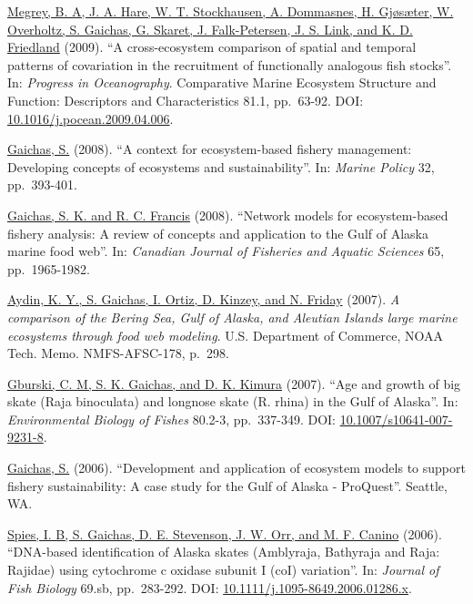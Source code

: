 \documentclass[11pt, a4paper]{awesome-cv}
\begin{document}
\protect\hyperlink{cite-megrey_cross-ecosystem_2009}{Megrey, B. A, J. A. Hare,
W. T. Stockhausen, A. Dommasnes, H. Gjøsæter, W. Overholtz, S. Gaichas,
G. Skaret, J. Falk-Petersen, J. S. Link, and K. D.
Friedland} (2009). ``A
cross-ecosystem comparison of spatial and temporal patterns of
covariation in the recruitment of functionally analogous fish stocks''.
In: \emph{Progress in Oceanography}. Comparative Marine Ecosystem Structure
and Function: Descriptors and Characteristics 81.1, pp.~63-92. DOI:
\href{https://doi.org/10.1016\%2Fj.pocean.2009.04.006}{10.1016/j.pocean.2009.04.006}.

\protect\hyperlink{cite-gaichas_context_2008}{Gaichas,
S.} (2008). ``A context for ecosystem-based
fishery management: Developing concepts of ecosystems and
sustainability''. In: \emph{Marine Policy} 32, pp.~393-401.

\protect\hyperlink{cite-gaichas_network_2008}{Gaichas, S. K. and R. C.
Francis} (2008). ``Network models for
ecosystem-based fishery analysis: A review of concepts and application
to the Gulf of Alaska marine food web''. In: \emph{Canadian Journal of
Fisheries and Aquatic Sciences} 65, pp.~1965-1982.

\protect\hyperlink{cite-aydin_comparison_2007}{Aydin, K. Y., S. Gaichas, I.
Ortiz, D. Kinzey, and N. Friday} (2007).
\emph{A comparison of the Bering Sea, Gulf of Alaska, and Aleutian Islands
large marine ecosystems through food web modeling}. U.S. Department of
Commerce, NOAA Tech. Memo. NMFS-AFSC-178, p.~298.

\protect\hyperlink{cite-gburski_age_2007}{Gburski, C. M, S. K. Gaichas, and D.
K. Kimura} (2007). ``Age and growth of big skate
(Raja binoculata) and longnose skate (R. rhina) in the Gulf of Alaska''.
In: \emph{Environmental Biology of Fishes} 80.2-3, pp.~337-349. DOI:
\href{https://doi.org/10.1007\%2Fs10641-007-9231-8}{10.1007/s10641-007-9231-8}.

\protect\hyperlink{cite-gaichas_development_2006}{Gaichas,
S.} (2006). ``Development and
application of ecosystem models to support fishery sustainability: A
case study for the Gulf of Alaska - ProQuest''. Seattle, WA.

\protect\hyperlink{cite-spies_dna-based_2006}{Spies, I. B, S. Gaichas, D. E.
Stevenson, J. W. Orr, and M. F. Canino}
(2006). ``DNA-based identification of Alaska skates (Amblyraja,
Bathyraja and Raja: Rajidae) using cytochrome c oxidase subunit I (coI)
variation''. In: \emph{Journal of Fish Biology} 69.sb, pp.~283-292. DOI:
\href{https://doi.org/10.1111\%2Fj.1095-8649.2006.01286.x}{10.1111/j.1095-8649.2006.01286.x}.
\end{document}
